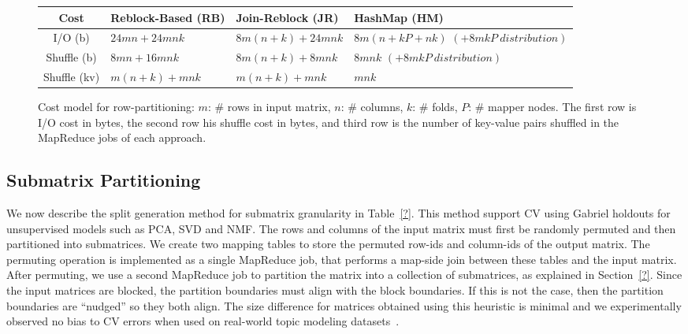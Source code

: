 \documentclass{vldb}
\begin{document}
\begin{figure}
\centering
\begin{tabular}{|c||p{1.6in}|p{1.3in}|p{1.2in}|}
\hline
Cost & Reblock-Based (RB) & Join-Reblock (JR) & HashMap (HM)\\
\hline
\hline
I/O (b) & $24mn + 24mnk$ & $8m(n + k) + 24mnk$ & \parbox[c]{1.2in}{$8m(n + kP + nk)$\\$(+ 8mkP ~distribution)$}\\
\hline
Shuffle (b) & $8mn + 16mnk$ & $8m(n + k) + 8mnk$ & \parbox[c]{1.2in}{$8mnk$\\$(+ 8mkP ~distribution)$}\\
\hline
Shuffle (kv) & $m(n + k) + mnk$ & $m(n + k) + mnk$ & \parbox[c]{1.2in}{$mnk$}\\
\hline
\end{tabular}
\caption{Cost model for row-partitioning: $m$: \# rows in input matrix, $n$: \# columns,
$k$: \# folds, $P$: \# mapper nodes. The first row is I/O cost in bytes, the second row his
shuffle cost in bytes, and third row is the number of key-value pairs shuffled
in the MapReduce jobs of each approach.}
\label{fig:costmodel}
\end{figure}

\subsection{Submatrix Partitioning}
\label{sec:submatrix}
We now describe the split generation method for submatrix granularity in Table~\ref{?}. 
This method support CV using Gabriel holdouts for unsupervised models 
such as PCA, SVD and NMF.
The rows and columns of the input matrix must first be randomly permuted 
and then partitioned into submatrices.
We create two mapping tables to store the permuted row-ids and column-ids of the output matrix. 
The permuting operation is implemented as a single MapReduce job, that 
performs a map-side join between these tables and the input matrix.
After permuting, we use a second MapReduce job to partition the matrix into a collection of submatrices, as explained in Section~\ref{?}.
Since the input matrices are blocked, the partition boundaries must align with the block boundaries. If this is not the case, then the partition boundaries are ``nudged'' so they 
both align. The size difference for matrices obtained using this heuristic is minimal and we experimentally observed no bias to CV errors when used on real-world topic modeling datasets~\cite{nips2010}.
\end{document}
